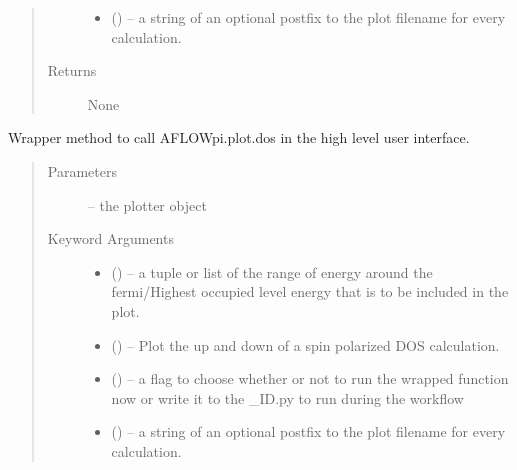 \documentclass[letterpaper,10pt,english]{sphinxmanual}
\begin{document}
\begin{fulllineitems}
\begin{fulllineitems}
\begin{quote}
\begin{description}
\begin{itemize}
\item {} 
 () -- a string of an optional postfix to the plot filename for every
calculation.

\end{itemize}

\item[{Returns}] \leavevmode
None

\end{description}\end{quote}

\end{fulllineitems}


\begin{fulllineitems}
\label{\detokenize{prep:prep.plotter.dos}}
Wrapper method to call AFLOWpi.plot.dos in the high level user interface.
\begin{quote}\begin{description}
\item[{Parameters}] \leavevmode
{} -- the plotter object

\item[{Keyword Arguments}] \leavevmode\begin{itemize}
\item {} 
 () -- a tuple or list of the range of energy around the fermi/Highest
occupied level energy that is to be included in the plot.

\item {} 
 () -- Plot the up and down of a spin polarized DOS
calculation.

\item {} 
 () -- a flag to choose whether or not to run the wrapped function now
or write it to the \_ID.py to run during the workflow

\item {} 
 () -- a string of an optional postfix to the plot filename for every
calculation.

\end{itemize}


\end{description}
\end{quote}
\end{fulllineitems}
\end{fulllineitems}
\end{document}
